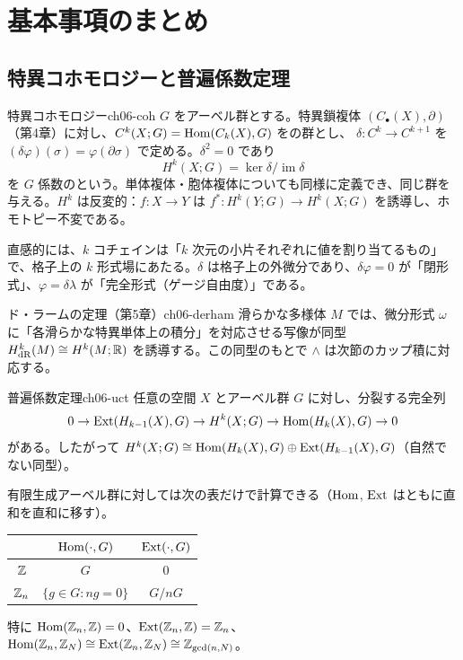 \section{基本事項のまとめ}

\subsection{特異コホモロジーと普遍係数定理}

\begin{mydef}{特異コホモロジー}{ch06-coh}
$G$ をアーベル群とする。特異鎖複体 $(C_\bullet(X),\partial)$（第4章）に対し、$C^k(X;G)=\operatorname{Hom}(C_k(X),G)$ をの群とし、 $\delta\colon C^k\to C^{k+1}$ を $(\delta\varphi)(\sigma)=\varphi(\partial\sigma)$ で定める。$\delta^2=0$ であり
\[
H^k(X;G)=\ker\delta/\operatorname{im}\delta
\]
を $G$ 係数のという。単体複体・胞体複体についても同様に定義でき、同じ群を与える。$H^k$ は反変的：$f\colon X\to Y$ は $f^*\colon H^k(Y;G)\to H^k(X;G)$ を誘導し、ホモトピー不変である。
\end{mydef}
直感的には、$k$ コチェインは「$k$ 次元の小片それぞれに値を割り当てるもの」で、格子上の $k$ 形式場にあたる。$\delta$ は格子上の外微分であり、$\delta\varphi=0$ が「閉形式」、$\varphi=\delta\lambda$ が「完全形式（ゲージ自由度）」である。

\begin{mythm}{ド・ラームの定理（第5章）}{ch06-derham}
滑らかな多様体 $M$ では、微分形式 $\omega$ に「各滑らかな特異単体上の積分」を対応させる写像が同型 $H^k_{\mathrm{dR}}(M)\cong H^k(M;\mathbb{R})$ を誘導する。この同型のもとで $\wedge$ は次節のカップ積に対応する。
\end{mythm}

\begin{mythm}{普遍係数定理}{ch06-uct}
任意の空間 $X$ とアーベル群 $G$ に対し、分裂する完全列
\[
0\to\operatorname{Ext}(H_{k-1}(X),G)\to H^k(X;G)\to\operatorname{Hom}(H_k(X),G)\to0
\]
がある。したがって $H^k(X;G)\cong\operatorname{Hom}(H_k(X),G)\oplus\operatorname{Ext}(H_{k-1}(X),G)$（自然でない同型）。
\end{mythm}
有限生成アーベル群に対しては次の表だけで計算できる（$\operatorname{Hom}$, $\operatorname{Ext}$ はともに直和を直和に移す）。
\begin{center}
\renewcommand{\arraystretch}{1.25}
\begin{tabular}{c|cc}
 & $\operatorname{Hom}(\cdot,G)$ & $\operatorname{Ext}(\cdot,G)$\\ \hline
$\mathbb{Z}$ & $G$ & $0$\\
$\mathbb{Z}_n$ & $\{g\in G:ng=0\}$ & $G/nG$
\end{tabular}
\end{center}
特に $\operatorname{Hom}(\mathbb{Z}_n,\mathbb{Z})=0$、$\operatorname{Ext}(\mathbb{Z}_n,\mathbb{Z})=\mathbb{Z}_n$、$\operatorname{Hom}(\mathbb{Z}_n,\mathbb{Z}_N)\cong\operatorname{Ext}(\mathbb{Z}_n,\mathbb{Z}_N)\cong\mathbb{Z}_{\gcd(n,N)}$。


